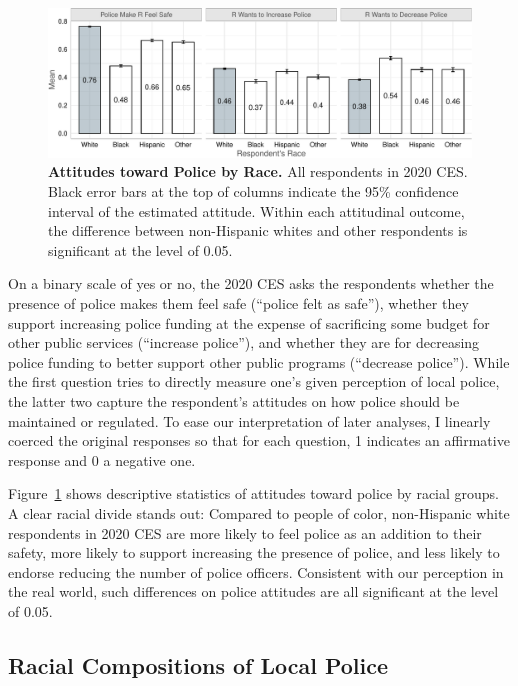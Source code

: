 \documentclass[
  12pt,
]{article}
\begin{document}
\begin{figure}[tb]

{\centering \includegraphics{racialized-police_files/figure-pdf/fig-attitudes-1.pdf}

}

\caption{\label{fig-attitudes}\textbf{Attitudes toward Police by Race.}
All respondents in 2020 CES. Black error bars at the top of columns
indicate the 95\% confidence interval of the estimated attitude. Within
each attitudinal outcome, the difference between non-Hispanic whites and
other respondents is significant at the level of 0.05.}

\end{figure}

On a binary scale of yes or no, the 2020 CES asks the respondents
whether the presence of police makes them feel safe (``police felt as
safe''), whether they support increasing police funding at the expense
of sacrificing some budget for other public services (``increase
police''), and whether they are for decreasing police funding to better
support other public programs (``decrease police''). While the first
question tries to directly measure one's given perception of local
police, the latter two capture the respondent's attitudes on how police
should be maintained or regulated. To ease our interpretation of later
analyses, I linearly coerced the original responses so that for each
question, 1 indicates an affirmative response and 0 a negative one.

Figure~\ref{fig-attitudes} shows descriptive statistics of attitudes
toward police by racial groups. A clear racial divide stands out:
Compared to people of color, non-Hispanic white respondents in 2020 CES
are more likely to feel police as an addition to their safety, more
likely to support increasing the presence of police, and less likely to
endorse reducing the number of police officers. Consistent with our
perception in the real world, such differences on police attitudes are
all significant at the level of 0.05.

\hypertarget{racial-compositions-of-local-police}{%
\subsection{Racial Compositions of Local
Police}\label{racial-compositions-of-local-police}}
\end{document}
